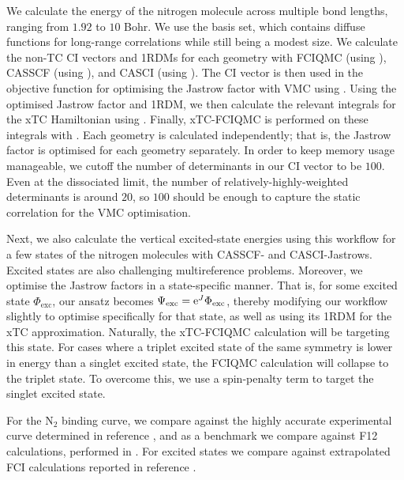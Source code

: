 We calculate the energy of the nitrogen molecule across multiple bond lengths, ranging from $1.92$ to $10$ Bohr. We use the \avtz basis set, which contains diffuse functions for long-range correlations while still being a modest size. We calculate the non-TC CI vectors and \glspl{1RDM} for each geometry with FCIQMC (using \neci),\supercite{gutherNECI2020} CASSCF (using \molpro),\supercite{wernerMOLPRO,wernerMolpro2012,wernerMolproQuantumChemistry2020} and CASCI (using \pyscf).\supercite{sunPySCF2018} The CI vector is then used in the objective function for optimising the Jastrow factor with VMC using \casino.\supercite{needsVariational2020} Using the optimised Jastrow factor and 1RDM, we then calculate the relevant integrals for the xTC Hamiltonian using \pytchint. Finally, xTC-FCIQMC is performed on these integrals with \neci. Each geometry is calculated independently; that is, the Jastrow factor is optimised for each geometry separately. In order to keep memory usage manageable, we cutoff the number of determinants in our CI vector to be $100$. Even at the dissociated limit, the number of relatively-highly-weighted determinants is around $20$, so $100$ should be enough to capture the static correlation for the VMC optimisation.

Next, we also calculate the vertical excited-state energies using this workflow for a few states of the nitrogen molecules with CASSCF- and CASCI-Jastrows. Excited states are also challenging multireference problems. Moreover, we optimise the Jastrow factors in a state-specific manner. That is, for some excited state $\Phi_\mathrm{exc}$, our ansatz becomes $\Psi_\mathrm{exc} = \mathrm{e}^J\Phi_\mathrm{exc}$, thereby modifying our workflow slightly to optimise specifically for that state, as well as using its 1RDM for the xTC approximation. Naturally, the xTC-FCIQMC calculation will be targeting this state. For cases where a triplet excited state of the same symmetry is lower in energy than a singlet excited state, the FCIQMC calculation will collapse to the triplet state. To overcome this, we use a spin-penalty term to target the singlet excited state.\supercite{weserSpin2022}

For the N$_2$ binding curve, we compare against the highly accurate experimental curve determined in reference , and as a benchmark we compare against F12 calculations, performed in \molpro.\supercite{wernerMOLPRO,wernerMolpro2012,wernerMolproQuantumChemistry2020} For excited states we compare against extrapolated FCI calculations reported in reference .

